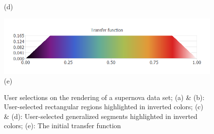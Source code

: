 \documentclass[twoside,twocolumn,10pt]{article}
\begin{document}
\begin{figure}
\begin{minipage}{.2\textwidth}
		(d)
	\end{minipage}
	\begin{minipage}{.49\textwidth}
	\centering
	\includegraphics[width=1\linewidth]{supernova_transfer_function}
	(e)
	\end{minipage}
	\caption{User selections on the rendering of a supernova data set; (a) \& (b): User-selected rectangular regions highlighted in inverted colors; (c) \& (d): User-selected generalized segments highlighted in inverted colors; (e): The initial transfer function}
	\label{fig:supernova_selection}
\end{figure}
\end{document}
